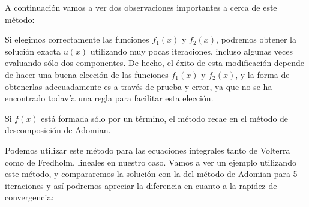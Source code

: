 A continuación vamos a ver dos observaciones importantes a cerca de este método:
\begin{observacion}
	Si elegimos correctamente las funciones $f_1(x)$ y $f_2(x)$, podremos obtener la solución exacta $u(x)$ utilizando muy pocas iteraciones, incluso algunas veces evaluando sólo dos componentes. De hecho, el éxito de esta modificación depende de hacer una buena elección de las funciones $f_1(x)$ y $f_2(x)$, y la forma de obtenerlas adecuadamente es a través de prueba y error, ya que no se ha encontrado todavía una regla para facilitar esta elección.
\end{observacion}

\begin{observacion}
	Si $f(x)$ está formada sólo por un término, el método recae en el método de descomposición de Adomian.
\end{observacion}

Podemos utilizar este método para las ecuaciones integrales tanto de Volterra como de Fredholm, lineales en nuestro caso. Vamos a ver un ejemplo utilizando este método, y compararemos la solución con la del método de Adomian para 5 iteraciones y así podremos apreciar la diferencia en cuanto a la rapidez de convergencia:

